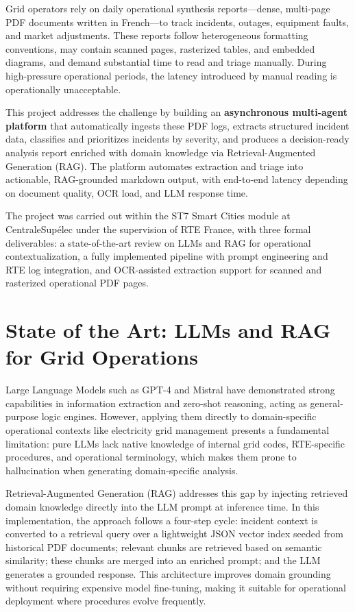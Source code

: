\documentclass[11pt,a4paper]{article}
\begin{document}
Grid operators rely on daily operational synthesis reports---dense, multi-page PDF documents written in French---to track incidents, outages, equipment faults, and market adjustments. These reports follow heterogeneous formatting conventions, may contain scanned pages, rasterized tables, and embedded diagrams, and demand substantial time to read and triage manually. During high-pressure operational periods, the latency introduced by manual reading is operationally unacceptable.

This project addresses the challenge by building an \textbf{asynchronous multi-agent platform} that automatically ingests these PDF logs, extracts structured incident data, classifies and prioritizes incidents by severity, and produces a decision-ready analysis report enriched with domain knowledge via Retrieval-Augmented Generation (RAG). The platform automates extraction and triage into actionable, RAG-grounded markdown output, with end-to-end latency depending on document quality, OCR load, and LLM response time.

The project was carried out within the ST7 Smart Cities module at CentraleSupélec under the supervision of RTE France, with three formal deliverables: a state-of-the-art review on LLMs and RAG for operational contextualization, a fully implemented pipeline with prompt engineering and RTE log integration, and OCR-assisted extraction support for scanned and rasterized operational PDF pages.

\section{State of the Art: LLMs and RAG for Grid Operations}

Large Language Models such as GPT-4 and Mistral have demonstrated strong capabilities in information extraction and zero-shot reasoning, acting as general-purpose logic engines. However, applying them directly to domain-specific operational contexts like electricity grid management presents a fundamental limitation: pure LLMs lack native knowledge of internal grid codes, RTE-specific procedures, and operational terminology, which makes them prone to hallucination when generating domain-specific analysis.

Retrieval-Augmented Generation (RAG) addresses this gap by injecting retrieved domain knowledge directly into the LLM prompt at inference time. In this implementation, the approach follows a four-step cycle: incident context is converted to a retrieval query over a lightweight JSON vector index seeded from historical PDF documents; relevant chunks are retrieved based on semantic similarity; these chunks are merged into an enriched prompt; and the LLM generates a grounded response. This architecture improves domain grounding without requiring expensive model fine-tuning, making it suitable for operational deployment where procedures evolve frequently.
\end{document}
